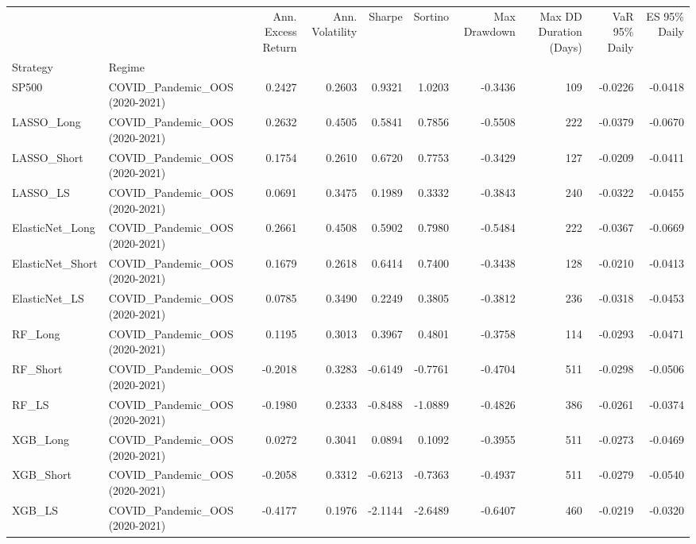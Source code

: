 \begin{tabular}{llrrrrrrrr}
\toprule
 &  & Ann. Excess Return & Ann. Volatility & Sharpe & Sortino & Max Drawdown & Max DD Duration (Days) & VaR 95\% Daily & ES 95\% Daily \\
Strategy & Regime &  &  &  &  &  &  &  &  \\
\midrule
SP500 & COVID\_Pandemic\_OOS (2020-2021) & 0.2427 & 0.2603 & 0.9321 & 1.0203 & -0.3436 & 109 & -0.0226 & -0.0418 \\
\cline{1-10}
LASSO\_Long & COVID\_Pandemic\_OOS (2020-2021) & 0.2632 & 0.4505 & 0.5841 & 0.7856 & -0.5508 & 222 & -0.0379 & -0.0670 \\
\cline{1-10}
LASSO\_Short & COVID\_Pandemic\_OOS (2020-2021) & 0.1754 & 0.2610 & 0.6720 & 0.7753 & -0.3429 & 127 & -0.0209 & -0.0411 \\
\cline{1-10}
LASSO\_LS & COVID\_Pandemic\_OOS (2020-2021) & 0.0691 & 0.3475 & 0.1989 & 0.3332 & -0.3843 & 240 & -0.0322 & -0.0455 \\
\cline{1-10}
ElasticNet\_Long & COVID\_Pandemic\_OOS (2020-2021) & 0.2661 & 0.4508 & 0.5902 & 0.7980 & -0.5484 & 222 & -0.0367 & -0.0669 \\
\cline{1-10}
ElasticNet\_Short & COVID\_Pandemic\_OOS (2020-2021) & 0.1679 & 0.2618 & 0.6414 & 0.7400 & -0.3438 & 128 & -0.0210 & -0.0413 \\
\cline{1-10}
ElasticNet\_LS & COVID\_Pandemic\_OOS (2020-2021) & 0.0785 & 0.3490 & 0.2249 & 0.3805 & -0.3812 & 236 & -0.0318 & -0.0453 \\
\cline{1-10}
RF\_Long & COVID\_Pandemic\_OOS (2020-2021) & 0.1195 & 0.3013 & 0.3967 & 0.4801 & -0.3758 & 114 & -0.0293 & -0.0471 \\
\cline{1-10}
RF\_Short & COVID\_Pandemic\_OOS (2020-2021) & -0.2018 & 0.3283 & -0.6149 & -0.7761 & -0.4704 & 511 & -0.0298 & -0.0506 \\
\cline{1-10}
RF\_LS & COVID\_Pandemic\_OOS (2020-2021) & -0.1980 & 0.2333 & -0.8488 & -1.0889 & -0.4826 & 386 & -0.0261 & -0.0374 \\
\cline{1-10}
XGB\_Long & COVID\_Pandemic\_OOS (2020-2021) & 0.0272 & 0.3041 & 0.0894 & 0.1092 & -0.3955 & 511 & -0.0273 & -0.0469 \\
\cline{1-10}
XGB\_Short & COVID\_Pandemic\_OOS (2020-2021) & -0.2058 & 0.3312 & -0.6213 & -0.7363 & -0.4937 & 511 & -0.0279 & -0.0540 \\
\cline{1-10}
XGB\_LS & COVID\_Pandemic\_OOS (2020-2021) & -0.4177 & 0.1976 & -2.1144 & -2.6489 & -0.6407 & 460 & -0.0219 & -0.0320 \\

\end{tabular}
